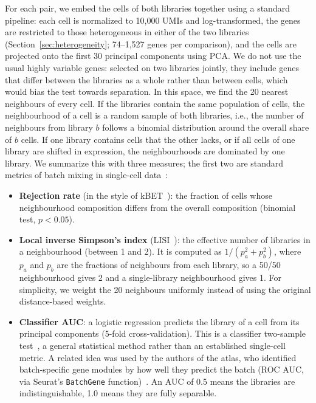 \documentclass[11pt,a4paper]{article}
\begin{document}
For each pair, we embed the cells of both libraries together using a standard pipeline: each cell is normalized to 10{,}000 UMIs and log-transformed, the genes are restricted to those heterogeneous in either of the two libraries (Section~\ref{sec:heterogeneity}; 74--1{,}527 genes per comparison), and the cells are projected onto the first 30 principal components using PCA. We do not use the usual highly variable genes: selected on two libraries jointly, they include genes that differ between the libraries as a whole rather than between cells, which would bias the test towards separation. In this space, we find the 20 nearest neighbours of every cell. If the libraries contain the same population of cells, the neighbourhood of a cell is a random sample of both libraries, i.e., the number of neighbours from library $b$ follows a binomial distribution around the overall share of $b$ cells. If one library contains cells that the other lacks, or if all cells of one library are shifted in expression, the neighbourhoods are dominated by one library. We summarize this with three measures; the first two are standard metrics of batch mixing in single-cell data~\cite{luecken2022benchmarking}:
\begin{itemize}
	\item \textbf{Rejection rate} (in the style of kBET~\cite{buttner2019kbet}): the fraction of cells whose neighbourhood composition differs from the overall composition (binomial test, $p<0.05$).
	\item \textbf{Local inverse Simpson's index} (LISI~\cite{korsunsky2019harmony}): the effective number of libraries in a neighbourhood (between 1 and 2). It is computed as $1/(p_a^2 + p_b^2)$, where $p_a$ and $p_b$ are the fractions of neighbours from each library, so a 50/50 neighbourhood gives 2 and a single-library neighbourhood gives 1. For simplicity, we weight the 20 neighbours uniformly instead of using the original distance-based weights.
	\item \textbf{Classifier AUC}: a logistic regression predicts the library of a cell from its principal components (5-fold cross-validation). This is a classifier two-sample test~\cite{lopezpaz2017c2st}, a general statistical method rather than an established single-cell metric. A related idea was used by the authors of the atlas, who identified batch-specific gene modules by how well they predict the batch (ROC AUC, via Seurat's \texttt{BatchGene} function)~\cite{farrell2018}. An AUC of 0.5 means the libraries are indistinguishable, 1.0 means they are fully separable.
\end{itemize}
\end{document}
